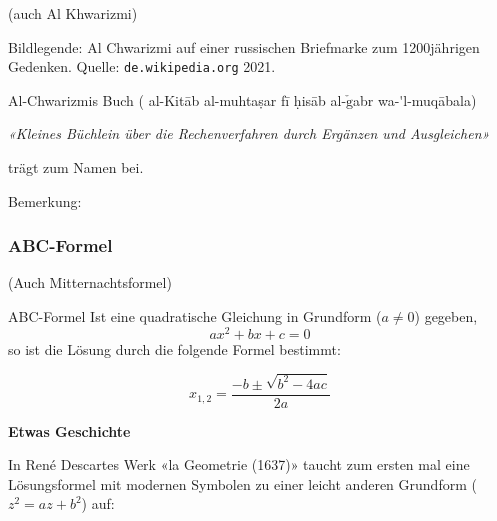 (auch Al Khwarizmi)

Bildlegende: Al Chwarizmi auf einer russischen Briefmarke zum
1200jährigen Gedenken. Quelle: \texttt{de.wikipedia.org} 2021.


Al-Chwarizmis Buch (
al-Kit\={a}b al-muhta\d{s}ar f\={i} \d{h}is\={a}b al-$\check{\text{g}}$abr
wa-\'{}l-muq\={a}bala)

\textit{«Kleines Büchlein über die Rechenverfahren durch Ergänzen und Ausgleichen»}

trägt zum Namen  bei.






Bemerkung:



\newpage



\subsubsection{ABC-Formel}
(Auch Mitternachtsformel)


\begin{gesetz}{ABC-Formel}{}
Ist eine quadratische Gleichung in Grundform ($a\ne 0$) gegeben,
$$ax^2 + bx + c = 0$$
so ist die Lösung durch die folgende Formel bestimmt:

$$x_{1,2}=\frac{-b\pm\sqrt{b^2-4ac}}{2a}$$
\end{gesetz}

\textbf{Etwas Geschichte}

In René Descartes Werk «la Geometrie (1637)» \cite{descartes1664} taucht zum ersten mal
eine Lösungsformel mit modernen Symbolen zu einer leicht anderen
Grundform ($z^2=az + b^2$) auf:

